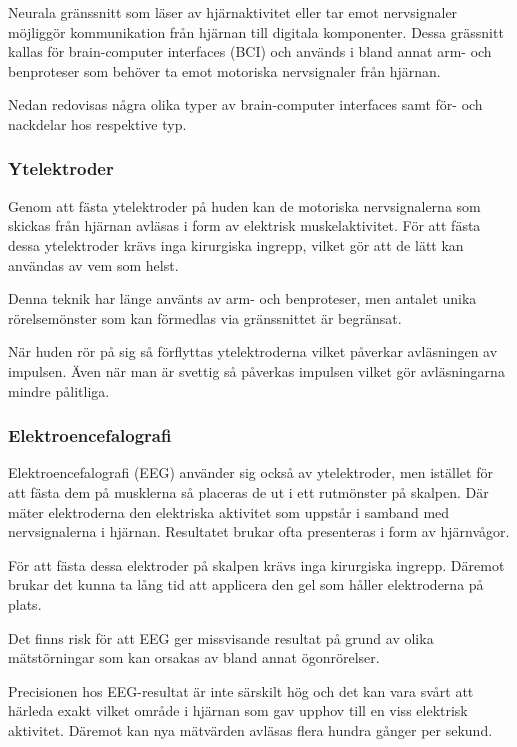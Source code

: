 \documentclass[12pt, a4paper]{article}
\begin{document}
Neurala gränssnitt som läser av hjärnaktivitet eller tar emot nervsignaler
möjliggör kommunikation från hjärnan till digitala komponenter. Dessa grässnitt
kallas för brain-computer interfaces (BCI) och används i bland annat arm- och
benproteser som behöver ta emot motoriska nervsignaler från hjärnan.

Nedan redovisas några olika typer av brain-computer interfaces samt för- och
nackdelar hos respektive typ.

\subsubsection{Ytelektroder}

Genom att fästa ytelektroder på huden kan de motoriska nervsignalerna som
skickas från hjärnan avläsas i form av elektrisk muskelaktivitet. För att fästa
dessa ytelektroder krävs inga kirurgiska ingrepp, vilket gör att de lätt kan
användas av vem som helst.

Denna teknik har länge använts av arm- och benproteser, men antalet unika
rörelsemönster som kan förmedlas via gränssnittet är begränsat.

När huden rör på sig så förflyttas ytelektroderna vilket påverkar avläsningen av
impulsen. Även när man är svettig så påverkas impulsen vilket gör avläsningarna
mindre pålitliga. \cite{prosthetic_operation}

\subsubsection{Elektroencefalografi}

Elektroencefalografi (EEG) använder sig också av ytelektroder, men istället för
att fästa dem på musklerna så placeras de ut i ett rutmönster på skalpen. Där
mäter elektroderna den elektriska aktivitet som uppstår i samband med
nervsignalerna i hjärnan. Resultatet brukar ofta presenteras i form av
hjärnvågor.

För att fästa dessa elektroder på skalpen krävs inga kirurgiska ingrepp. Däremot
brukar det kunna ta lång tid att applicera den gel som håller elektroderna på
plats.

Det finns risk för att EEG ger missvisande resultat på grund av olika
mätstörningar som kan orsakas av bland annat ögonrörelser.

Precisionen hos EEG-resultat är inte särskilt hög och det kan vara svårt att
härleda exakt vilket område i hjärnan som gav upphov till en viss elektrisk
aktivitet. Däremot kan nya mätvärden avläsas flera hundra gånger per sekund.
\end{document}
